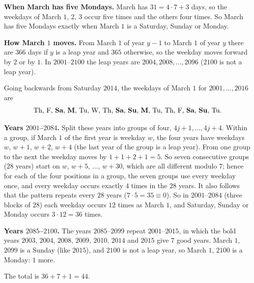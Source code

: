\textbf{When March has five Mondays.} March has $31=4\cdot7+3$ days, so the weekdays of March $1$, $2$, $3$ occur five times and the others four times. So March has five Mondays exactly when March $1$ is a Saturday, Sunday or Monday.

\textbf{How March $1$ moves.} From March $1$ of year $y-1$ to March $1$ of year $y$ there are $366$ days if $y$ is a leap year and $365$ otherwise, so the weekday moves forward by $2$ or by $1$. In $2001$--$2100$ the leap years are $2004,2008,\dots,2096$ ($2100$ is not a leap year).

Going backwards from Saturday $2014$, the weekdays of March $1$ for $2001,\dots,2016$ are
\[\text{Th, F, \textbf{Sa}, \textbf{M}, Tu, W, Th, \textbf{Sa}, \textbf{Su}, \textbf{M}, Tu, Th, F, \textbf{Sa}, \textbf{Su}, Tu}.\]

\textbf{Years $2001$--$2084$.} Split these years into groups of four, $4j+1,\dots,4j+4$. Within a group, if March $1$ of the first year is weekday $w$, the four years have weekdays $w$, $w+1$, $w+2$, $w+4$ (the last year of the group is a leap year). From one group to the next the weekday moves by $1+1+2+1=5$. So seven consecutive groups ($28$ years) start on $w$, $w+5$, $\dots$, $w+30$, which are all different modulo $7$; hence for each of the four positions in a group, the seven groups use every weekday once, and every weekday occurs exactly $4$ times in the $28$ years. It also follows that the pattern repeats every $28$ years ($7\cdot5=35\equiv0$). So in $2001$--$2084$ (three blocks of $28$) each weekday occurs $12$ times as March $1$, and Saturday, Sunday or Monday occurs $3\cdot12=36$ times.

\textbf{Years $2085$--$2100$.} The years $2085$--$2099$ repeat $2001$--$2015$, in which the bold years $2003$, $2004$, $2008$, $2009$, $2010$, $2014$ and $2015$ give $7$ good years. March $1$, $2099$ is a Sunday (like $2015$), and $2100$ is not a leap year, so March $1$, $2100$ is a Monday: $1$ more.

The total is $36+7+1=\boxed{44}$.
